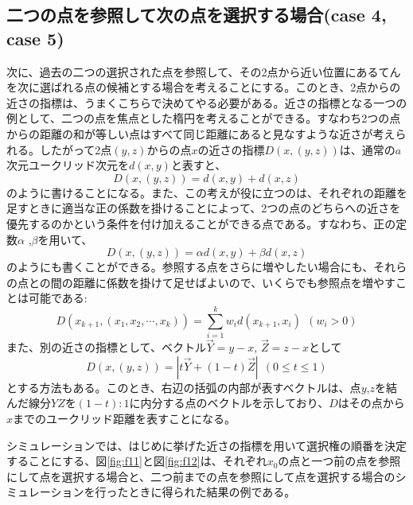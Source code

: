 \subsection{二つの点を参照して次の点を選択する場合(case 4, case 5)}

次に、過去の二つの選択された点を参照して、その2点から近い位置にあるてんを次に選ばれる点の候補とする場合を考えることにする。このとき、2点からの近さの指標は、うまくこちらで決めてやる必要がある。近さの指標となる一つの例として、二つの点を焦点とした楕円を考えることができる。すなわち2つの点からの距離の和が等しい点はすべて同じ距離にあると見なすような近さが考えられる。したがって2点$(y, z)$からの点$x$の近さの指標$D(x, (y, z))$は、通常の$a$次元ユークリッド次元を$d(x,y)$と表すと、
\[D(x, (y, z)) = d(x,y) + d(x, z)\]
のように書けることになる。また、この考えが役に立つのは、それぞれの距離を足すときに適当な正の係数を掛けることによって、2つの点のどちらへの近さを優先するのかという条件を付け加えることができる点である。すなわち、正の定数$\alpha$ ,$\beta$を用いて、
\[D(x, (y, z)) = \alpha d(x,y) + \beta d(x, z)\]
のようにも書くことができる。参照する点をさらに増やしたい場合にも、それらの点との間の距離に係数を掛けて足せばよいので、いくらでも参照点を増やすことは可能である:
\[D(x_{k+1}, (x_{1}, x_{2}, \cdots , x_{k})) = \sum_{i=1}^{k}w_{i}d(x_{k+1}, x_{i})\ \ (w_{i} > 0)\]
また、別の近さの指標として、ベクトル$\vec{Y} = y-x$, $\vec{Z} = z-x$として
\[D(x, (y,z)) = |t\vec{Y} + (1-t)\vec{Z}|\ \ (0 \le t \le 1)\]
とする方法もある。このとき、右辺の括弧の内部が表すベクトルは、点$y$,$z$を結んだ線分$YZ$を$(1-t):1$に内分する点のベクトルを示しており、$D$はその点から$x$までのユークリッド距離を表すことになる。

シミュレーションでは、はじめに挙げた近さの指標を用いて選択権の順番を決定することにする、図\ref{fig:f11}と図\ref{fig:f12}は、それぞれ$x_{0}$の点と一つ前の点を参照にして点を選択する場合と、二つ前までの点を参照にして点を選択する場合のシミュレーションを行ったときに得られた結果の例である。

